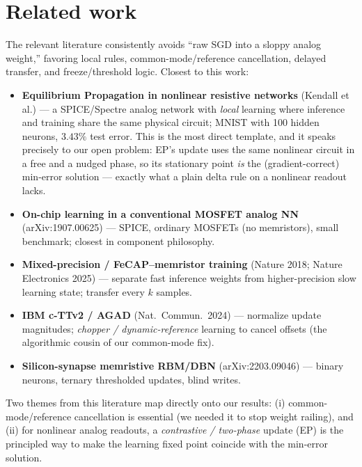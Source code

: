 \documentclass[11pt]{article}
\begin{document}
\section{Related work}
The relevant literature consistently avoids ``raw SGD into a sloppy analog weight,''
favoring local rules, common-mode/reference cancellation, delayed transfer, and
freeze/threshold logic. Closest to this work:
\begin{itemize}\setlength\itemsep{1pt}
\item \textbf{Equilibrium Propagation in nonlinear resistive networks} (Kendall et al.)
--- a SPICE/Spectre analog network with \emph{local} learning where inference and
training share the same physical circuit; MNIST with 100 hidden neurons, $3.43\%$ test
error. This is the most direct template, and it speaks precisely to our open problem:
EP's update uses the same nonlinear circuit in a free and a nudged phase, so its
stationary point \emph{is} the (gradient-correct) min-error solution --- exactly what a
plain delta rule on a nonlinear readout lacks.
\item \textbf{On-chip learning in a conventional MOSFET analog NN} (arXiv:1907.00625)
--- SPICE, ordinary MOSFETs (no memristors), small benchmark; closest in component
philosophy.
\item \textbf{Mixed-precision / FeCAP--memristor training} (Nature 2018; Nature
Electronics 2025) --- separate fast inference weights from higher-precision slow
learning state; transfer every $k$ samples.
\item \textbf{IBM c-TTv2 / AGAD} (Nat.\ Commun.\ 2024) --- normalize update magnitudes;
\emph{chopper / dynamic-reference} learning to cancel offsets (the algorithmic cousin of
our common-mode fix).
\item \textbf{Silicon-synapse memristive RBM/DBN} (arXiv:2203.09046) --- binary neurons,
ternary thresholded updates, blind writes.
\end{itemize}
Two themes from this literature map directly onto our results: (i) common-mode/reference
cancellation is essential (we needed it to stop weight railing), and (ii) for nonlinear
analog readouts, a \emph{contrastive / two-phase} update (EP) is the principled way to
make the learning fixed point coincide with the min-error solution.
\end{document}
